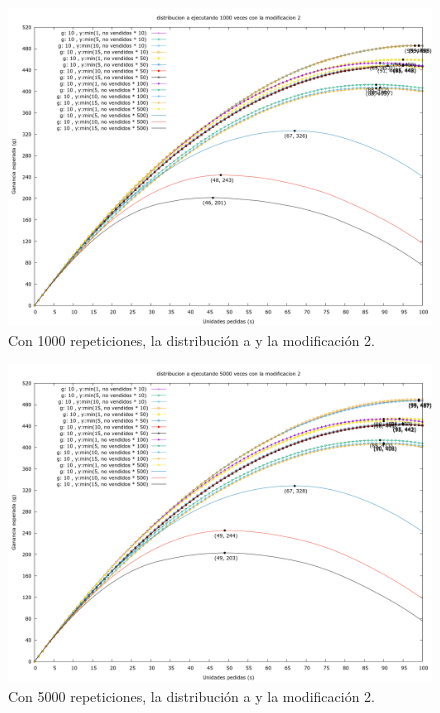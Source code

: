 \documentclass[12pt, spanish]{article}
\begin{document}
\begin{figure}[H]
	\centering
	\includegraphics[scale = 0.2]{prob_a/datos_a_1000_2.png}
	\caption{Con 1000 repeticiones, la distribución a y la modificación 2.}
	\label{fig:ej1_a_1000}

\end{figure}

\begin{figure}[H]
	\centering
	\includegraphics[scale = 0.2]{prob_a/datos_a_5000_2.png}
	\caption{Con 5000 repeticiones, la distribución a y la modificación 2.}
	\label{fig:ej1_a_5000}

\end{figure}
\end{document}
